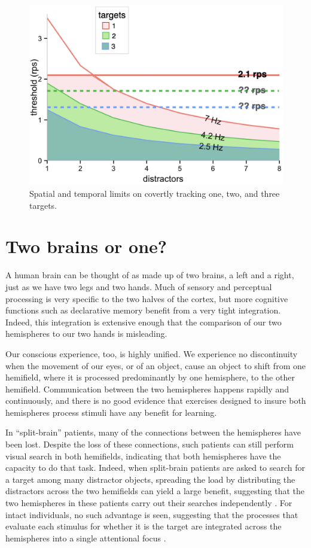 \documentclass[
]{book}
\begin{document}
\begin{figure}
\includegraphics[width=1\linewidth]{imagesForRmd/temporalAndSpeedLimits} \caption{Spatial and temporal limits on covertly tracking one, two, and three targets. }\label{fig:unnamed-chunk-10}
\end{figure}

\hypertarget{twoBrains}{%
\chapter{Two brains or one?}\label{twoBrains}}

A human brain can be thought of as made up of two brains, a left and a right, just as we have two legs and two hands.
Much of sensory and perceptual processing is very specific to the two halves of the cortex, but more cognitive functions such as declarative memory benefit from a very tight integration. Indeed, this integration is extensive enough that the comparison of our two hemispheres to our two hands is misleading.

Our conscious experience, too, is highly unified. We experience no discontinuity when the movement of our eyes, or of an object, cause an object to shift from one hemifield, where it is processed predominantly by one hemisphere, to the other hemifield. Communication between the two hemispheres happens rapidly and continuously, and there is no good evidence that exercises designed to insure both hemispheres process stimuli have any benefit for learning.

In ``split-brain'' patients, many of the connections between the hemispheres have been lost. Despite the loss of these connections, such patients can still perform visual search in both hemifields, indicating that both hemispheres have the capacity to do that task. Indeed, when split-brain patients are asked to search for a target among many distractor objects, spreading the load by distributing the distractors across the two hemifields can yield a large benefit, suggesting that the two hemispheres in these patients carry out their searches independently \citep{luckIndependentAttentionalScanning1994a}. For intact individuals, no such advantage is seen, suggesting that the processes that evaluate each stimulus for whether it is the target are integrated across the hemispheres into a single attentional focus \citep{luckIndependentHemisphericAttentional1989}.
\end{document}
